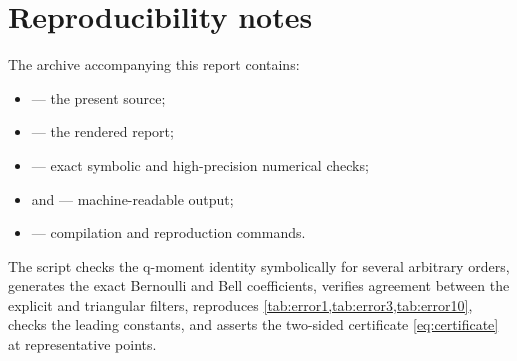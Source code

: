 \documentclass[11pt]{article}
\theoremstyle{definition}
\theoremstyle{remark}
\begin{document}
\section{Reproducibility notes}
\label{app:repro}

The archive accompanying this report contains:
\begin{itemize}[leftmargin=8mm]
\item {} --- the present source;
\item {} --- the rendered report;
\item {} --- exact symbolic and high-precision
numerical checks;
\item {} and  ---
machine-readable output;
\item {} --- compilation and reproduction commands.
\end{itemize}

The script checks the q-moment identity symbolically for several arbitrary
orders, generates the exact Bernoulli and Bell coefficients, verifies agreement
between the explicit and triangular filters, reproduces
\cref{tab:error1,tab:error3,tab:error10}, checks the leading constants, and
asserts the two-sided certificate \eqref{eq:certificate} at representative
points.
\end{document}
